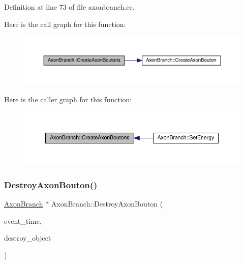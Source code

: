 Definition at line 73 of file axonbranch.\+cc.

Here is the call graph for this function\+:
\nopagebreak
\begin{figure}[H]
\begin{center}
\leavevmode
\includegraphics[width=350pt]{class_axon_branch_a77e93626a7993f76e689d09721974e90_cgraph}
\end{center}
\end{figure}
Here is the caller graph for this function\+:
\nopagebreak
\begin{figure}[H]
\begin{center}
\leavevmode
\includegraphics[width=350pt]{class_axon_branch_a77e93626a7993f76e689d09721974e90_icgraph}
\end{center}
\end{figure}
\mbox{\label{class_axon_branch_a024c8666555702ebe67e2a5caf1b866a}} 
\subsubsection{\texorpdfstring{Destroy\+Axon\+Bouton()}{DestroyAxonBouton()}}
{\footnotesize\ttfamily \hyperlink{class_axon_branch}{Axon\+Branch} $\ast$ Axon\+Branch\+::\+Destroy\+Axon\+Bouton (\begin{DoxyParamCaption}\item[{std\+::chrono\+::time\+\_\+point$<$ \hyperlink{universe_8h_a0ef8d951d1ca5ab3cfaf7ab4c7a6fd80}{Clock} $>$}]{event\+\_\+time,  }\item[{\hyperlink{class_axon_branch}{Axon\+Branch} $\ast$}]{destroy\+\_\+object }\end{DoxyParamCaption})}



